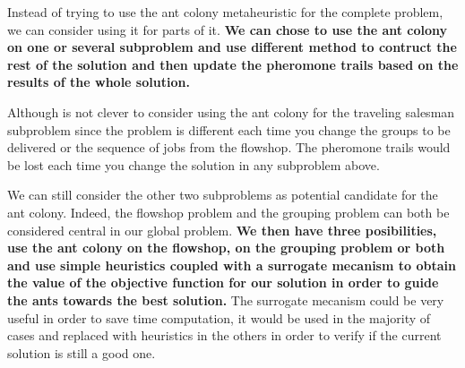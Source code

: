 \documentclass[UTF8, twoside]{EPURapport}
\begin{document}
	Instead of trying to use the ant colony metaheuristic for the complete problem, we can consider using it for parts of it. \textbf{We can chose to use the ant colony on one or several subproblem and use different method to contruct the rest of the solution and then update the pheromone trails based on the results of the whole solution.} 
	
	Although is not clever to consider using the ant colony for the traveling salesman subproblem since the problem is different each time you change the groups to be delivered or the sequence of jobs from the flowshop. The pheromone trails would be lost each time you change the solution in any subproblem above.
	
	We can still consider the other two subproblems as potential candidate for the ant colony. Indeed, the flowshop problem and the grouping problem can both be considered central in our global problem. \textbf{We then have three posibilities, use the ant colony on the flowshop, on the grouping problem or both and use simple heuristics coupled with a surrogate mecanism to obtain the value of the objective function for our solution in order to guide the ants towards the best solution.} The surrogate mecanism could be very useful in order to save time computation, it would be used in the majority of cases and replaced with heuristics in the others in order to verify if the current solution is still a good one.
	
\end{document}
